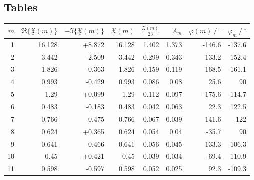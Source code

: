 \documentclass{article}
\begin{document}
\subsection{Tables}
\begin{tabular}{rrrrrrrr} \toprule
    {$m$} & {$\Re\{\underline{\mathfrak{X}}(m)\}$} & {$-\Im\{\underline{\mathfrak{X}}(m)\}$} & {$\mathfrak{X}(m)$} & {$\frac{\mathfrak{X}(m)}{23}$} & {$A_m$} & {$\varphi(m)\ /\ ^{\circ}$} & {$\varphi_m\ /\ ^{\circ}$} \\ \midrule
    1  & 16.128 & +8.872 & 16.128 & 1.402 & 1.373 & -146.6 & -137.6 \\
    2  & 3.442  & -2.509 & 3.442  & 0.299 & 0.343 & 133.2  & 152.4  \\
    3  & 1.826  & -0.363 & 1.826  & 0.159 & 0.119 & 168.5  & -161.1 \\
    4  & 0.993  & -0.429 & 0.993  & 0.086 & 0.08  & 25.6   & 90     \\ \midrule
    5  & 1.29   & +0.099 & 1.29   & 0.112 & 0.097 & -175.6 & -114.7 \\
    6  & 0.483  & -0.183 & 0.483  & 0.042 & 0.063 & 22.3   & 122.5  \\
    7  & 0.766  & -0.475 & 0.766  & 0.067 & 0.039 & 141.6  & -122   \\
    8  & 0.624  & +0.365 & 0.624  & 0.054 & 0.04  & -35.7  & 90     \\ \midrule
    9  & 0.641  & -0.466 & 0.641  & 0.056 & 0.045 & 133.3  & -106.3 \\
    10 & 0.45   & +0.421 & 0.45   & 0.039 & 0.034 & -69.4  & 110.9  \\
    11 & 0.598  & -0.597 & 0.598  & 0.052 & 0.025 & 92.3   & -109.3 \\ \bottomrule
\end{tabular}
\end{document}
